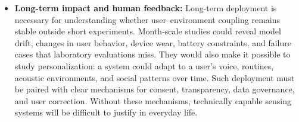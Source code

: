 \documentclass[11pt]{gsasthesis} %
\begin{document}
\begin{itemize}
  \item \textbf{Long-term impact and human feedback:}
  Long-term deployment is necessary for understanding whether user--environment coupling remains stable outside short experiments. Month-scale studies could reveal model drift, changes in user behavior, device wear, battery constraints, and failure cases that laboratory evaluations miss. They would also make it possible to study personalization: a system could adapt to a user's voice, routines, acoustic environments, and social patterns over time. Such deployment must be paired with clear mechanisms for consent, transparency, data governance, and user correction. Without these mechanisms, technically capable sensing systems will be difficult to justify in everyday life.

\end{itemize}



\begin{singlespacing}
  \renewcommand{\bibname}{References}

  
  
\end{singlespacing}


\begin{singlespacing}
\end{singlespacing}

%
\end{document}
